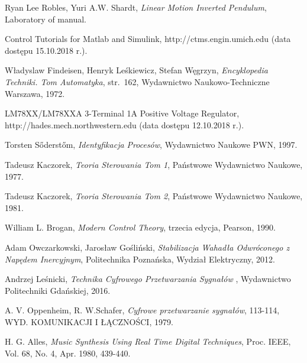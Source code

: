 \documentclass[nostrict]{szablonPG}
\begin{document}



	\setcounter{page}{3}
	\let\cleardoublepage\clearpage
	
	
	\tableofcontents    %
	
%	
	
	
	
	
	
	
%	
	
	
	

	\listoffigures      %
	\listoftables

	\begin{thebibliography}{20}                      %
		\small              %
		Ryan Lee Robles, Yuri A.W. Shardt, \emph{Linear Motion Inverted Pendulum}, Laboratory of manual.
		
		Control Tutorials for Matlab and Simulink, http://ctms.engin.umich.edu (data dost\k{e}pu 15.10.2018 r.).
		
		W\l{}adyslaw Findeisen, Henryk Le\'skiewicz, Stefan W\k{e}grzyn, \emph{Encyklopedia Techniki. Tom Automatyka}, str.~162, Wydawnictwo Naukowo-Techniczne Warszawa, 1972.
		
		 LM78XX/LM78XXA 3-Terminal 1A Positive Voltage Regulator, http://hades.mech.northwestern.edu (data dost\k{e}pu 12.10.2018 r.).
		
		Torsten S{\H o}derst{\H o}m, \emph{Identyfikacja Proces\'ow}, Wydawnictwo Naukowe PWN, 1997.
		
		Tadeusz Kaczorek, \emph{Teoria Sterowania Tom 1}, Pa\'nstwowe Wydawnictwo Naukowe, 1977.
		
		Tadeusz Kaczorek, \emph{Teoria Sterowania Tom 2}, Pa\'nstwowe Wydawnictwo Naukowe, 1981.
		
		William L. Brogan, \emph{Modern Control Theory}, trzecia edycja, Pearson, 1990.

		Adam Owczarkowski, Jaros\l{}aw Go\'sli\'nski, \emph{Stabilizacja Wahad\l{}a Odwr\'oconego z Nap\k{e}dem Inercyjnym}, Politechnika Pozna\'nska, Wydzia\l{} Elektryczny, 2012.
				
		Andrzej Le\'snicki, \emph{Technika Cyfrowego Przetwarzania Sygna\l{}\'ow }, Wydawnictwo Politechniki Gda\'nskiej, 2016.
		
		A. V. Oppenheim, R. W.Schafer, \emph{Cyfrowe przetwarzanie sygnałów}, 113-114, WYD. KOMUNIKACJI I ŁĄCZNOŚCI, 1979.
		
		 H. G. Alles, \emph{Music Synthesis Using Real Time Digital Techniques}, Proc. IEEE, Vol. 68, No. 4, Apr. 1980, 439-440.

			
	\end{thebibliography}
	
\end{document}
